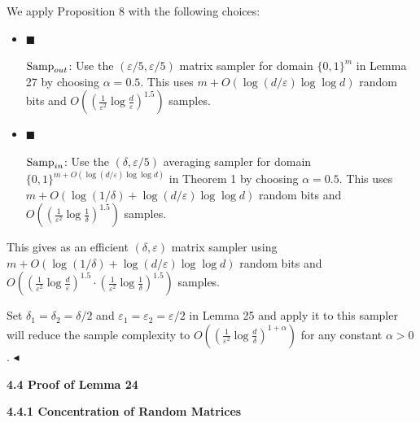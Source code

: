 \documentclass[10pt,a4paper]{article}
\begin{document}
We apply Proposition 8 with the following choices:\par


\begin{itemize}


\item[] 
$\blacksquare$ 


$\textup{{Samp}}_{out}$: Use the $(\varepsilon/5,\varepsilon/5)$ matrix sampler for domain $\{0,1\}^{m}$ in Lemma 27 by choosing $\alpha=0.5$. This uses $m+O(\log(d/\varepsilon)\log\log d)$ random bits and $O((\frac{1}{\varepsilon^{2}}\log\frac{d}{\varepsilon})^{1.5})$ samples.\par





\item[] 
$\blacksquare$ 


$\textup{{Samp}}_{in}$: Use the $(\delta,\varepsilon/5)$ averaging sampler for domain $\{0,1\}^{m+O(\log(d/\varepsilon)\log\log d)}$ in Theorem 1 by choosing $\alpha=0.5$. This uses $m+O(\log(1/\delta)+\log(d/\varepsilon)\log\log d)$ random bits and $O((\frac{1}{\varepsilon^{2}}\log\frac{1}{\delta})^{1.5})$ samples.\par





\end{itemize}


This gives as an efficient $(\delta,\varepsilon)$ matrix sampler using $m+O(\log(1/\delta)+\log(d/\varepsilon)\log\log d)$ random bits and $O((\frac{1}{\varepsilon^{2}}\log\frac{d}{\varepsilon})^{1.5}\cdot(\frac{1}{\varepsilon^{2}}\log\frac{1}{\delta})^{1.5})$ samples.\par




Set $\delta_{1}=\delta_{2}=\delta/2$ and $\varepsilon_{1}=\varepsilon_{2}=\varepsilon/2$ in Lemma 25 and apply it to this sampler will reduce the sample complexity to $O((\frac{1}{\varepsilon^{2}}\log\frac{d}{\delta})^{1+\alpha})$ for any constant $\alpha>0$.
$\blacktriangleleft$\par






\par\medskip\noindent\textbf{
4.4 Proof of Lemma 24
}\par




\par\medskip\noindent\textbf{
4.4.1 Concentration of Random Matrices}\par
\end{document}
